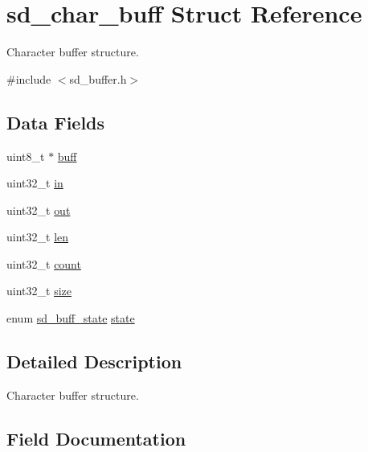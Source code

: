 \hypertarget{structsd__char__buff}{}\section{sd\+\_\+char\+\_\+buff Struct Reference}
\label{structsd__char__buff}


Character buffer structure.  




{\ttfamily \#include $<$sd\+\_\+buffer.\+h$>$}

\subsection*{Data Fields}
\begin{DoxyCompactItemize}
\item 
uint8\+\_\+t $\ast$ \mbox{\hyperlink{structsd__char__buff_a8b212742c92a124f2eb4a244acc19f7c}{buff}}
\item 
uint32\+\_\+t \mbox{\hyperlink{structsd__char__buff_a86fd6c417fa43c58339f7cde29495419}{in}}
\item 
uint32\+\_\+t \mbox{\hyperlink{structsd__char__buff_ab27775f0ed2b042b439a7431fbe311eb}{out}}
\item 
uint32\+\_\+t \mbox{\hyperlink{structsd__char__buff_a96bbf959016e4411c9e6b9812a8be60a}{len}}
\item 
uint32\+\_\+t \mbox{\hyperlink{structsd__char__buff_a86988a65e0d3ece7990c032c159786d6}{count}}
\item 
uint32\+\_\+t \mbox{\hyperlink{structsd__char__buff_ab2c6b258f02add8fdf4cfc7c371dd772}{size}}
\item 
enum \mbox{\hyperlink{group___s_d___buffer___types_ga52f14e9c7b7d9ba092e1cd615559012b}{sd\+\_\+buff\+\_\+state}} \mbox{\hyperlink{structsd__char__buff_aa88ff4ca3b7aaba9e9aaa27fd9ea94a9}{state}}
\end{DoxyCompactItemize}


\subsection{Detailed Description}
Character buffer structure. 

\subsection{Field Documentation}
\mbox{\label{structsd__char__buff_a8b212742c92a124f2eb4a244acc19f7c}} 
